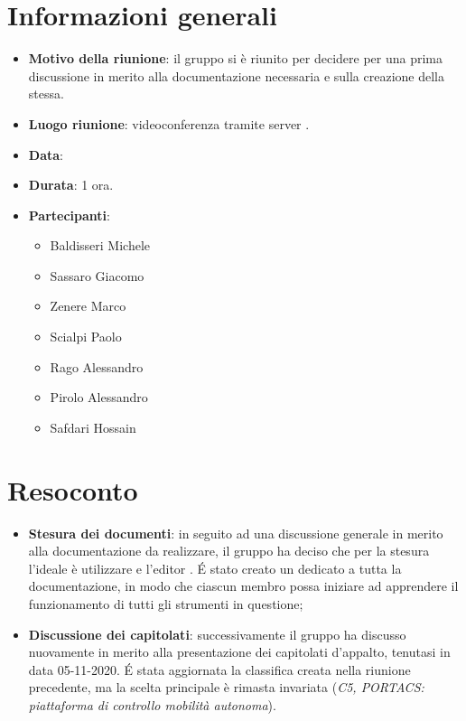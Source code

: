 \section{Informazioni generali}
\begin{itemize}
\item \textbf{Motivo della riunione}: il gruppo si è riunito per decidere per una prima discussione in merito alla documentazione necessaria e sulla creazione della stessa.
\item \textbf{Luogo riunione}: videoconferenza tramite server .
\item \textbf{Data}: \Data{}
\item \textbf{Durata}: 1 ora.
\item \textbf{Partecipanti}:
	\begin{itemize}
	\item Baldisseri Michele
	\item Sassaro Giacomo
	\item Zenere Marco
	\item Scialpi Paolo
	\item Rago Alessandro
	\item Pirolo Alessandro
	\item Safdari Hossain
	\end{itemize}
\end{itemize}
\newpage
\section{Resoconto}
\begin{itemize}
\item \textbf{Stesura dei documenti}: in seguito ad una discussione generale in merito alla documentazione da realizzare, il gruppo ha deciso che per la stesura l'ideale è utilizzare  e l'editor . \'E stato creato un  dedicato a tutta la documentazione, in modo che ciascun membro possa iniziare ad apprendere il funzionamento di tutti gli strumenti in questione;

\item \textbf{Discussione dei capitolati}: successivamente il gruppo ha discusso nuovamente in merito alla presentazione dei capitolati d'appalto, tenutasi in data 05-11-2020. \'E stata aggiornata la classifica creata nella riunione precedente, ma la scelta principale è rimasta invariata (\textit{C5, PORTACS: piattaforma di controllo mobilità autonoma}).
\end{itemize}